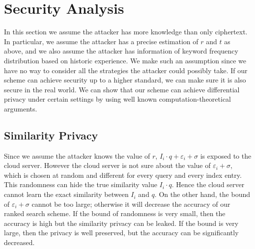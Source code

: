 \documentclass{article}
\begin{document}
\section{Security Analysis}
In this section we assume the attacker has more knowledge than only ciphertext. In particular, we assume the attacker has a precise estimation of $r$ and $t$ as above, and we also assume the attacker has information of keyword frequency distribution based on historic experience. We make such an assumption since we have no way to consider all the strategies the attacker could possibly take. If our scheme can achieve security up to a higher standard, we can make sure it is also secure in the real world. We can show that our scheme can achieve differential privacy under certain settings by using well known computation-theoretical arguments.

\subsection{Similarity Privacy}
Since we assume the attacker knows the value of $r$, $I_i\cdot q+\varepsilon_i+\sigma$ is exposed to the cloud server. However the cloud server is not sure about the value of $\varepsilon_i+\sigma$, which is chosen at random and different for every query and every index entry. This randomness can hide the true similarity value $I_i\cdot q$. Hence the cloud server cannot learn the exact similarity between $I_i$ and $q$. On the other hand, the bound of $\varepsilon_i+\sigma$ cannot be too large; otherwise it will decrease the accuracy of our ranked search scheme. If the bound of randomness is very small, then the accuracy is high but the similarity privacy can be leaked. If the bound is very large, then the privacy is well preserved, but the accuracy can be significantly decreased.
\end{document}
